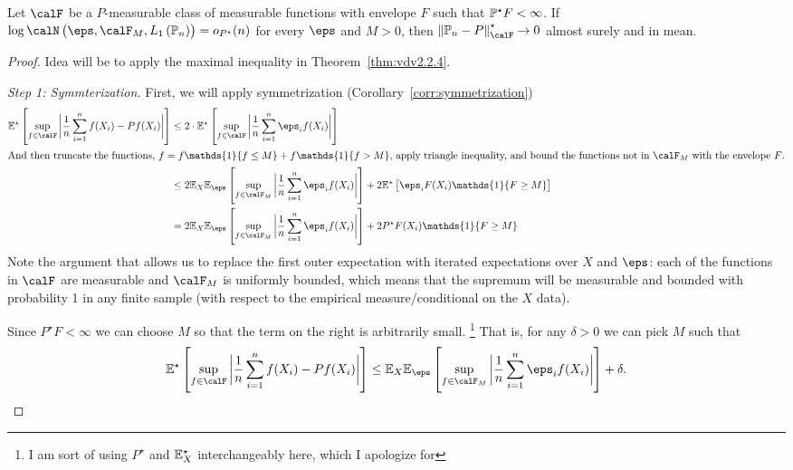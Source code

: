 \begin{theorem}
	\label{thm:vdv2.4.3}
	Let \(\calF\) be a  \(P\)-measurable class of measurable functions with envelope \(F\) such that \(\P^\star F<\infty\). If  \(\log\calN\left(\eps,\calF_M,L_1\left(\P_n\right)\right)= o_{P^\star}(n)\) for every \(\eps\) and  \(M > 0\), then  \(\left\|\P_n-P\right\|^\star_\calF\to 0\) almost surely and in mean. 		
\end{theorem}

\begin{proof}
	Idea will be to apply the maximal inequality in Theorem~\ref{thm:vdv2.2.4}.

	\textit{Step 1: Symmterization.} First, we will apply symmetrization (Corollary~\ref{corr:symmetrization})
	\begin{align*}
		\E^\star\left[\sup_{f\in\calF}\bigg|\frac{1}{n}\sum_{i=1}^n f(X_i)-Pf(X_i)\bigg|\right] 
		&\leq 2\cdot\E^\star\left[\sup_{f\in\calF}\bigg|\frac{1}{n}\sum_{i=1}^n \eps_if(X_i)\bigg|\right] \\
		\intertext{And then truncate the functions, \(f = f\mathds{1}\{f\leq M\} + f\mathds{1}\{f > M\} \), apply triangle inequality, and bound the functions not in \(\calF_M\) with the envelope \(F\).}
		&\leq  2\E_X\E_\eps \left[\sup_{f\in\calF_M}\bigg|\frac{1}{n}\sum_{i=1}^n
		\eps_if(X_i) \bigg|\right] + 2\E^\star\left[\eps_iF(X_i)\mathds{1}\{F \geq M\}\right]	\\
		&=  2\E_X\E_\eps \left[\sup_{f\in\calF_M}\bigg|\frac{1}{n}\sum_{i=1}^n
		\eps_if(X_i) \bigg|\right] + 2P^\star F(X_i)\mathds{1}\{F \geq M\}	
	\end{align*}
	Note the argument that allows us to replace the first outer expectation with iterated expectations over \(X\) and  \(\eps\): each of the functions in \(\calF\) are measurable and  \(\calF_M\) is uniformly bounded, which means that the supremum will be measurable and bounded with probability 1 in any finite sample (with respect to the empirical measure/conditional on the \(X\) data).

	Since \(P^\star F <\infty\) we can choose \(M\) so that the term on the right is arbitrarily small. \footnote{ I am sort of using \(P^\star\) and  \(\E^\star_X\) interchangeably here, which I apologize for } That is, for any \(\delta > 0\) we can pick  \(M\) such that
	\[
		\E^\star\left[\sup_{f\in\calF}\bigg|\frac{1}{n}\sum_{i=1}^n f(X_i)-Pf(X_i)\bigg|\right] \leq \E_X\E_\eps\left[\sup_{f\in\calF_M}\bigg|\frac{1}{n}\sum_{i=1}^n \eps_if(X_i)\bigg|\right] + \delta
	.\]


\end{proof}
